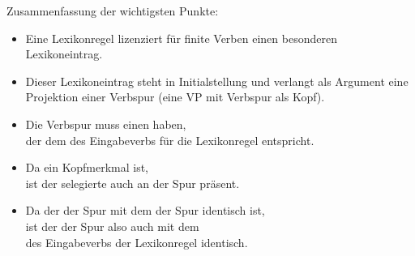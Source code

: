 {{\pause
Zusammenfassung der wichtigsten Punkte:
\begin{itemize}[<+->]
\item Eine Lexikonregel lizenziert für finite Verben einen besonderen Lexikoneintrag.
\item Dieser Lexikoneintrag steht in Initialstellung und verlangt als Argument eine Projektion
      einer Verbspur (eine VP mit Verbspur als Kopf).
\item Die Verbspur muss einen \dslw haben,\\
      der dem \localw des Eingabeverbs für die Lexikonregel  entspricht.
\item Da \dsl ein Kopfmerkmal ist,\\
      ist der selegierte \dslw auch an der Spur präsent.
\item Da der \dslw der Spur mit dem \localw der Spur identisch ist,\\
      ist der \localw der Spur also auch mit dem \localw\\
      des Eingabeverbs der Lexikonregel identisch.
\end{itemize}

}


}
